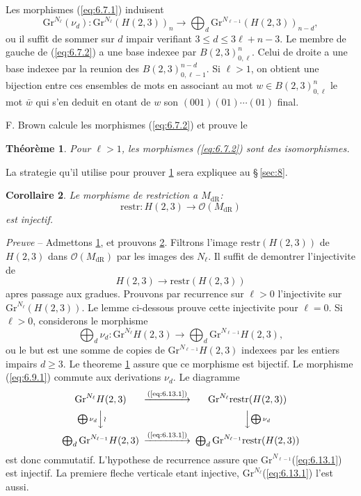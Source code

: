 \documentclass[11pt,a4paper]{article}
\theoremstyle{plain}
\newtheorem{theorem}{Th\'eor\`eme}
\newtheorem{corollary}[theorem]{Corollaire}
\theoremstyle{definition}
\newcommand{\dR}{\mathrm{dR}}
\newcommand{\Gr}{\mathrm{Gr}}
\begin{document}
Les morphismes (\ref{eq:6.7.1}) induisent
\begin{equation}\label{eq:6.7.2}
\Gr^{N_{\ell}}(\nu_d): \Gr^{N_{\ell}}(H(2,3))_n \to \bigoplus_d \Gr^{N_{\ell-1}}(H(2,3))_{n-d},
\end{equation}
ou il suffit de sommer sur $d$ impair verifiant $3 \leq d \leq 3\ell + n - 3$. Le membre de gauche de (\ref{eq:6.7.2}) a une base indexee par $B(2,3)_{0,\ell}^n$. Celui de droite a une base indexee par la reunion des $B(2,3)_{0,\ell-1}^{n-d}$. Si $\ell > 1$, on obtient une bijection entre ces ensembles de mots en associant au mot $w \in B(2,3)_{0,\ell}^n$ le mot $\bar{w}$ qui s'en deduit en otant de $w$ son $(001)(01)\cdots(01)$ final.

F. Brown calcule les morphismes (\ref{eq:6.7.2}) et prouve le

\begin{theorem}\label{thm:6.8}
Pour $\ell > 1$, les morphismes (\ref{eq:6.7.2}) sont des isomorphismes.
\end{theorem}

La strategie qu'il utilise pour prouver \ref{thm:6.8} sera expliquee au \S\,\ref{sec:8}.

\begin{corollary}\label{cor:6.9}
Le morphisme de restriction a $M_{\dR}$:
\begin{equation}\label{eq:6.9.1}
\mathrm{restr}: H(2,3) \to \mathcal{O}(M_{\dR})
\end{equation}
est injectif.
\end{corollary}

\noindent \textit{Preuve} -- Admettons \ref{thm:6.8}, et prouvons \ref{cor:6.9}. Filtrons l'image $\mathrm{restr}(H(2,3))$ de $H(2,3)$ dans $\mathcal{O}(M_{\dR})$ par les images des $N_{\ell}$. Il suffit de demontrer l'injectivite de
\begin{equation}\label{eq:6.13.1}
H(2,3) \to \mathrm{restr}(H(2,3))
\end{equation}
apres passage aux gradues. Prouvons par recurrence sur $\ell > 0$ l'injectivite sur $\Gr^{N_{\ell}}(H(2,3))$. Le lemme ci-dessous prouve cette injectivite pour $\ell = 0$. Si $\ell > 0$, considerons le morphisme
\[
\bigoplus_d \nu_d: \Gr^{N_{\ell}} H(2,3) \to \bigoplus_d \Gr^{N_{\ell-1}} H(2,3),
\]
ou le but est une somme de copies de $\Gr^{N_{\ell-1}} H(2,3)$ indexees par les entiers impairs $d \geq 3$. Le theoreme \ref{thm:6.8} assure que ce morphisme est bijectif. Le morphisme (\ref{eq:6.9.1}) commute aux derivations $\nu_d$. Le diagramme
\[
\begin{CD}
\Gr^{N_{\ell}} H(2,3) @>\text{(\ref{eq:6.13.1})}> > \Gr^{N_{\ell}} \mathrm{restr}(H(2,3)) \\
@V{\bigoplus \nu_d}V{\wr}V @VV{\bigoplus \nu_d}V \\
\bigoplus_d \Gr^{N_{\ell-1}} H(2,3) @>\text{(\ref{eq:6.13.1})}> > \bigoplus_d \Gr^{N_{\ell-1}} \mathrm{restr}(H(2,3))
\end{CD}
\]
est donc commutatif. L'hypothese de recurrence assure que $\Gr^{N_{\ell-1}}$(\ref{eq:6.13.1}) est injectif. La premiere fleche verticale etant injective, $\Gr^{N_{\ell}}$(\ref{eq:6.13.1}) l'est aussi.
\end{document}
